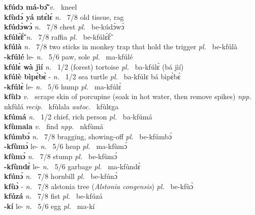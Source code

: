 {\bfseries kfúdɔ má-bɔ̃̂}  {\itshape v.~} kneel    \\ 
{\bfseries kfùdɔ́ yá ntɛ́lɛ́}  {\itshape n.~} 7/8 old tissue, rag    \\ 
{\bfseries kfúdɔ̀wɔ̀}  {\itshape n.~} 7/8 chest {\itshape pl.~} be-kúdɔ̀wɔ̀    \\ 
{\bfseries kfúlɛ̃́ɛ̃́}  {\itshape n.~} 7/8 raffia {\itshape pl.~} be-kfúlɛ̃́ɛ̃́    \\ 
{\bfseries kfúlà}  {\itshape n.~} 7/8 two sticks in monkey trap that hold the trigger {\itshape pl.~} be-kfúlà    \\ 
{\bfseries -kfúlé} le- {\itshape n.~} 5/6 paw, sole {\itshape pl.~} ma-kfúlé    \\ 
{\bfseries kfúlɛ̀ wà jìí}  {\itshape n.~} 1/2 (forest) tortoise {\itshape pl.~} ba-kfúlɛ̀  (bá jìí)  \\ 
{\bfseries kfúlè bìpɛ̀bɛ̀} - {\itshape n.~} 1/2 sea turtle  {\itshape pl.~} ba-kfúlɛ bá bìpɛ̀bɛ̀  \\ 
{\bfseries -kfúlɛ̀} le- {\itshape n.~} 5/6 hump {\itshape pl.~} ma-kfúlɛ̀   \\ 
{\bfseries kfùlɔ}  {\itshape v.~} scrape skin of porcupine (soak in hot water, then remove spikes)   {\itshape npp.~} nkfùlá {\itshape recip.~} kfùlala {\itshape autoc.~} kfùlɛga  \\ 
{\bfseries kfúmá}  {\itshape n.~} 1/2 chief, rich person {\itshape pl.~} ba-kfúmá    \\ 
{\bfseries kfùmala}  {\itshape v.~} find   {\itshape npp.~} nkfùmá  \\ 
{\bfseries kfúmbɔ́}  {\itshape n.~} 7/8 bragging, showing-off {\itshape pl.~} be-kfúmbɔ́    \\ 
{\bfseries -kfùmɔ́} le- {\itshape n.~} 5/6 heap {\itshape pl.~} ma-kfùmɔ́    \\ 
{\bfseries kfùmɔ́}  {\itshape n.~} 7/8 stump {\itshape pl.~}  be-kfùmɔ́    \\ 
{\bfseries -kfùndɛ̀} le- {\itshape n.~} 5/6 garbage {\itshape pl.~} ma-kfùndɛ̀    \\ 
{\bfseries kfúnɔ́}  {\itshape n.~} 7/8 hornbill {\itshape pl.~} be-kfúnɔ́    \\ 
{\bfseries kfùɔ̀} - {\itshape n.~} 7/8 alstonia tree ({\itshape Alstonia congensis}) {\itshape pl.~} be-kfùɔ̀    \\ 
{\bfseries kfúzá}  {\itshape n.~} 7/8 fist {\itshape pl.~} be-kfúzá    \\ 
{\bfseries -kí} le- {\itshape n.~} 5/6 egg {\itshape pl.~} ma-kí    \\ 
